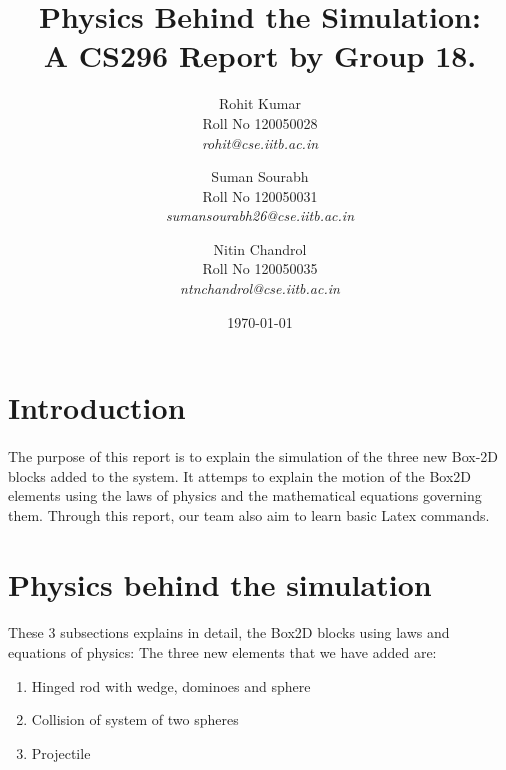 \documentclass[11pt]{article}
\begin{document}
\title{Physics Behind the Simulation:\\
	A CS296 Report by Group 18.}
	
\author{Rohit Kumar \\
		\textup{Roll No 120050028} \\
		\textit{rohit@cse.iitb.ac.in}
	\and
	Suman Sourabh \\
	\textup{Roll No 120050031} \\
	\textit{sumansourabh26@cse.iitb.ac.in}
	\and
	Nitin Chandrol\\
	\textup{Roll No 120050035} \\
	\textit{ntnchandrol@cse.iitb.ac.in}
	}

\date{\today}

\maketitle

\section{Introduction}

	\paragraph{}
	The purpose of this report is to explain the simulation of the three new Box-2D\cite{box} blocks added to the system. It attemps to explain 
	the motion of the Box2D elements using the laws of physics and the mathematical equations governing them. Through this report, our team also
	aim to learn basic Latex commands\cite{andyroberts}. 
 
 
\section{Physics behind the simulation}
\paragraph{}
These 3 subsections explains in detail, the Box2D blocks using laws and equations of physics:
	The three new elements that we have added are:
	
	\begin{enumerate}
	\item Hinged rod with wedge, dominoes and sphere
	\item Collision of system of two spheres
	\item Projectile
	\end{enumerate}
\end{document}
